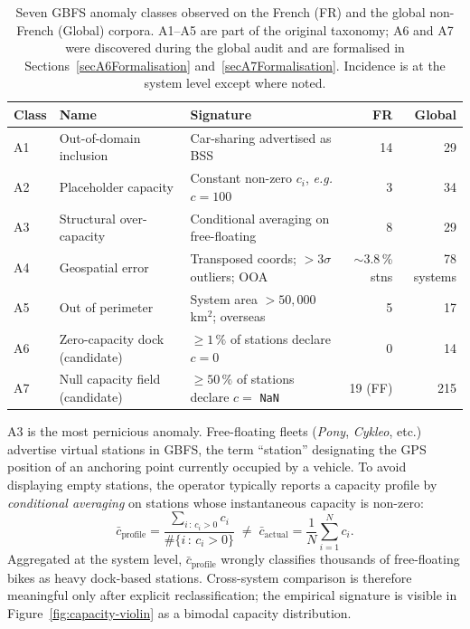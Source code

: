 \documentclass[11pt,a4paper]{article}
\newcommand{\eg}{\emph{e.g.}}
\newcommand{\etc}{etc.}
\begin{document}
\begin{table}[ht]
\centering
\caption{Seven GBFS anomaly classes observed on the French (FR) and
the global non-French (Global) corpora. A1--A5 are part of the
original taxonomy; A6 and A7 were discovered during the global audit
and are formalised in Sections~\ref{secA6Formalisation}
and~\ref{secA7Formalisation}. Incidence is at the system level except
where noted.}
\label{tab:anomalies}
\small
\begin{tabular}{@{}lllrr@{}}
\toprule
\textbf{Class} & \textbf{Name} & \textbf{Signature} & \textbf{FR} & \textbf{Global}\\
\midrule
A1 & Out-of-domain inclusion       & Car-sharing advertised as BSS                  & 14         & 29        \\
A2 & Placeholder capacity          & Constant non-zero $c_i$, \eg $c = 100$         &  3         & 34        \\
A3 & Structural over-capacity      & Conditional averaging on free-floating         &  8         & 29        \\
A4 & Geospatial error              & Transposed coords; $>3\sigma$ outliers; OOA    & $\sim$3.8\,\% stns & 78 systems\\
A5 & Out of perimeter              & System area $>50{,}000$\,km$^2$; overseas      &  5         & 17        \\
A6 & Zero-capacity dock (candidate)& $\geq 1\,\%$ of stations declare $c = 0$       &  0         & 14        \\
A7 & Null capacity field (candidate)& $\geq 50\,\%$ of stations declare $c = $ \texttt{NaN} & 19 (FF) & 215 \\
\bottomrule
\end{tabular}
\end{table}

A3 is the most pernicious anomaly. Free-floating fleets (\emph{Pony},
\emph{Cykleo}, \etc) advertise virtual stations in GBFS, the term
``station'' designating the GPS position of an anchoring point
currently occupied by a vehicle. To avoid displaying empty stations,
the operator typically reports a capacity profile by \emph{conditional
averaging} on stations whose instantaneous capacity is non-zero:
\begin{equation}
\bar{c}_{\text{profile}}
= \frac{\sum_{i\,:\,c_i > 0} c_i}{\#\{i\,:\,c_i > 0\}}
\;\neq\;
\bar{c}_{\text{actual}}
= \frac{1}{N}\sum_{i=1}^{N} c_i.
\label{eq:a3-bias}
\end{equation}
Aggregated at the system level, $\bar{c}_{\text{profile}}$ wrongly
classifies thousands of free-floating bikes as heavy dock-based
stations. Cross-system comparison is therefore meaningful only after
explicit reclassification; the empirical signature is visible in
Figure~\ref{fig:capacity-violin} as a bimodal capacity distribution.
\end{document}
